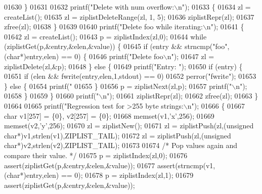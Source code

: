 \begin{DoxyCode}
{{{{{{{{{{{{{{{{{{{{{{{{{{{01630     \}
01631 
01632     printf(\textcolor{stringliteral}{"Delete with num overflow:\(\backslash\)n"});
01633     \{
01634         zl = createList();
01635         zl = ziplistDeleteRange(zl, 1, 5);
01636         ziplistRepr(zl);
01637         zfree(zl);
01638     \}
01639 
01640     printf(\textcolor{stringliteral}{"Delete foo while iterating:\(\backslash\)n"});
01641     \{
01642         zl = createList();
01643         p = ziplistIndex(zl,0);
01644         \textcolor{keywordflow}{while} (ziplistGet(p,&entry,&elen,&value)) \{
01645             \textcolor{keywordflow}{if} (entry && strncmp(\textcolor{stringliteral}{"foo"},(\textcolor{keywordtype}{char}*)entry,elen) == 0) \{
01646                 printf(\textcolor{stringliteral}{"Delete foo\(\backslash\)n"});
01647                 zl = ziplistDelete(zl,&p);
01648             \} \textcolor{keywordflow}{else} \{
01649                 printf(\textcolor{stringliteral}{"Entry: "});
01650                 \textcolor{keywordflow}{if} (entry) \{
01651                     \textcolor{keywordflow}{if} (elen && fwrite(entry,elen,1,stdout) == 0)
01652                         perror(\textcolor{stringliteral}{"fwrite"});
01653                 \} \textcolor{keywordflow}{else} \{
01654                     printf(\textcolor{stringliteral}{"%
01655                 \}
01656                 p = ziplistNext(zl,p);
01657                 printf(\textcolor{stringliteral}{"\(\backslash\)n"});
01658             \}
01659         \}
01660         printf(\textcolor{stringliteral}{"\(\backslash\)n"});
01661         ziplistRepr(zl);
01662         zfree(zl);
01663     \}
01664 
01665     printf(\textcolor{stringliteral}{"Regression test for >255 byte strings:\(\backslash\)n"});
01666     \{
01667         \textcolor{keywordtype}{char} v1[257] = \{0\}, v2[257] = \{0\};
01668         memset(v1,\textcolor{stringliteral}{'x'},256);
01669         memset(v2,\textcolor{stringliteral}{'y'},256);
01670         zl = ziplistNew();
01671         zl = ziplistPush(zl,(\textcolor{keywordtype}{unsigned} \textcolor{keywordtype}{char}*)v1,strlen(v1),ZIPLIST\_TAIL);
01672         zl = ziplistPush(zl,(\textcolor{keywordtype}{unsigned} \textcolor{keywordtype}{char}*)v2,strlen(v2),ZIPLIST\_TAIL);
01673 
01674         \textcolor{comment}{/* Pop values again and compare their value. */}
01675         p = ziplistIndex(zl,0);
01676         assert(ziplistGet(p,&entry,&elen,&value));
01677         assert(strncmp(v1,(\textcolor{keywordtype}{char}*)entry,elen) == 0);
01678         p = ziplistIndex(zl,1);
01679         assert(ziplistGet(p,&entry,&elen,&value));
}}}}}}}}}}}}}}}}}}}}}}}}}}}}
\end{DoxyCode}
